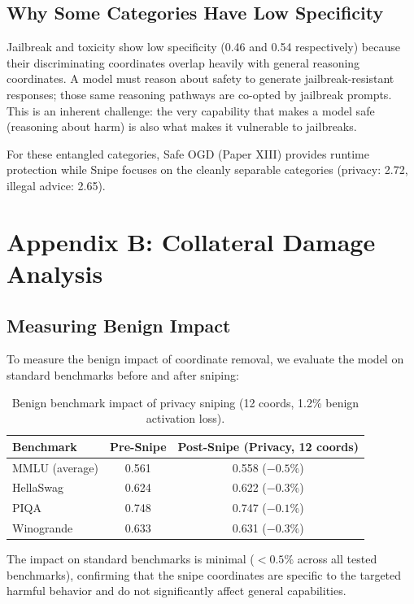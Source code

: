 \documentclass[11pt,a4paper]{article}
\begin{document}
\subsection{Why Some Categories Have Low Specificity}

Jailbreak and toxicity show low specificity (0.46 and 0.54 respectively) because their discriminating coordinates overlap heavily with general reasoning coordinates. A model must reason about safety to generate jailbreak-resistant responses; those same reasoning pathways are co-opted by jailbreak prompts. This is an inherent challenge: the very capability that makes a model safe (reasoning about harm) is also what makes it vulnerable to jailbreaks.

For these entangled categories, Safe OGD (Paper XIII) provides runtime protection while Snipe focuses on the cleanly separable categories (privacy: 2.72, illegal advice: 2.65).

\newpage

\section{Appendix B: Collateral Damage Analysis}

\subsection{Measuring Benign Impact}

To measure the benign impact of coordinate removal, we evaluate the model on standard benchmarks before and after sniping:

\begin{table}[h]\centering
\begin{tabular}{lcc}\toprule
Benchmark & Pre-Snipe & Post-Snipe (Privacy, 12 coords) \\\midrule
MMLU (average) & 0.561 & 0.558 ($-0.5\%$) \\
HellaSwag & 0.624 & 0.622 ($-0.3\%$) \\
PIQA & 0.748 & 0.747 ($-0.1\%$) \\
Winogrande & 0.633 & 0.631 ($-0.3\%$) \\\bottomrule
\end{tabular}
\caption{Benign benchmark impact of privacy sniping (12 coords, 1.2\% benign activation loss).}
\end{table}

The impact on standard benchmarks is minimal ($<0.5\%$ across all tested benchmarks), confirming that the snipe coordinates are specific to the targeted harmful behavior and do not significantly affect general capabilities.
\end{document}
